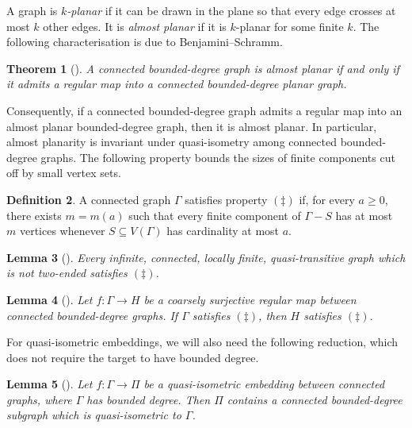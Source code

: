 \documentclass[10pt,a4paper]{amsart}
\newtheorem{theorem}{Theorem}[section]%
\newtheorem{lemma}[theorem]{Lemma}
\theoremstyle{definition}
\newtheorem{definition}[theorem]{Definition}
\begin{document}
A graph is \emph{$k$-planar} if it can be drawn in the plane so that every edge crosses at most $k$ other edges.
It is \emph{almost planar} if it is $k$-planar for some finite $k$.
The following characterisation is due to Benjamini--Schramm.

\begin{theorem}[{\cite[Thm.~1.8]{benjamini1996harmonic}}]\label{thm:almost-planar-regular}
A connected bounded-degree graph is almost planar if and only if it admits a regular map into a connected bounded-degree planar graph.
\end{theorem}

Consequently, if a connected bounded-degree graph admits a regular map into an almost planar bounded-degree graph, then it is almost planar.
In particular, almost planarity is invariant under quasi-isometry among connected bounded-degree graphs.
The following property bounds the sizes of finite components cut off by small vertex sets.


\begin{definition}\label{def:ddagger}
A connected graph $\Gamma$ satisfies property $(\ddagger)$ if, for every $a\geq0$, there exists $m=m(a)$ such that every finite component of $\Gamma-S$ has at most $m$ vertices whenever $S\subseteq V(\Gamma)$ has cardinality at most $a$.
\end{definition}

\begin{lemma}[{\cite[Prop.~3.8]{mackay2026almost}}]\label{lem:quasi-transitive-ddagger}
Every infinite, connected, locally finite, quasi-transitive graph which is not two-ended satisfies $(\ddagger)$.
\end{lemma}

\begin{lemma}[{\cite[Lem.~3.10]{mackay2026almost}}]\label{lem:regular-ddagger}
Let $f:\Gamma\to H$ be a coarsely surjective regular map between connected bounded-degree graphs.
If $\Gamma$ satisfies $(\ddagger)$, then $H$ satisfies $(\ddagger)$.
\end{lemma}

For quasi-isometric embeddings, we will also need the following reduction, which does not require the target to have bounded degree.

\begin{lemma}[{\cite[Prop.~1.11]{macmanus2023accessibility}}]\label{lem:bounded-degree-qi-image}
Let $f:\Gamma\to\Pi$ be a quasi-isometric embedding between connected graphs, where $\Gamma$ has bounded degree.
Then $\Pi$ contains a connected bounded-degree subgraph which is quasi-isometric to $\Gamma$.
\end{lemma}
\end{document}
